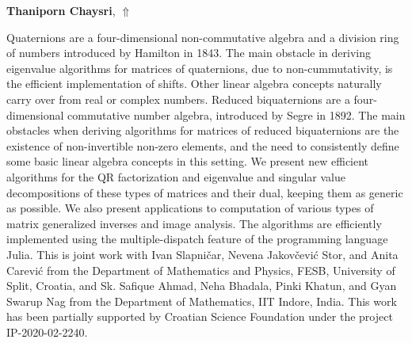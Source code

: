 \documentclass[ILAS2025-program.tex]{subfiles}
\begin{document}
\hypertarget{down0101}{}\begin{ilasabstract}
    
\textbf{Thaniporn Chaysri},  \hfill \hyperlink{up0101}{$\Uparrow$}
    
    
\mtskip
    Quaternions are a four-dimensional non-commutative algebra and a division ring of numbers introduced by Hamilton in 1843. The main obstacle in deriving eigenvalue algorithms for matrices of quaternions, due to non-cummutativity, is the efficient implementation of shifts. Other linear algebra concepts naturally carry over from real or complex numbers. 
Reduced biquaternions are a four-dimensional commutative number algebra, introduced by Segre in 1892. The main obstacles when deriving algorithms for matrices of reduced biquaternions are the existence of non-invertible non-zero elements, and the need to consistently define some basic linear algebra concepts in this setting. 
We present new efficient algorithms for the QR factorization and eigenvalue and singular value decompositions of these types of matrices and their dual, keeping them as generic as possible. 
We also present applications to computation of various types of matrix generalized inverses and image analysis. The algorithms are efficiently implemented using the multiple-dispatch feature of the programming language Julia. 
This is joint work with Ivan Slapni{\v c}ar, Nevena Jakov{\v c}evi{\' c} Stor, and Anita Carevi{\' c} from the Department of Mathematics and Physics, FESB, University of Split, Croatia, and Sk. Safique Ahmad, Neha Bhadala, Pinki Khatun, and Gyan Swarup Nag from the Department of Mathematics, IIT Indore, India.
This work has been partially supported by Croatian Science Foundation under the project IP-2020-02-2240.

\end{ilasabstract}
    
\end{document}
